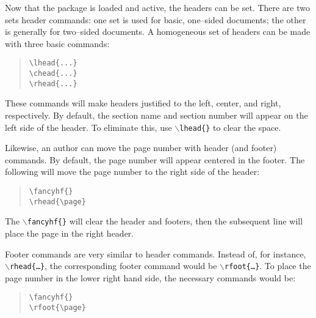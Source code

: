 \documentclass{article}
\begin{document}
Now that the package is loaded and active, the headers can be set. There are two sets header commands: one set is used for basic, one--sided documents; the other is generally for two--sided documents. A homogeneous set of headers can be made with three basic commands:
\begin{quote}
\begin{verbatim}
\lhead{...}
\chead{...}
\rhead{...}
\end{verbatim}
\end{quote}
These commands will make headers justified to the left, center, and right, respectively. By default, the section name and section number will appear on the left side of the header. To eliminate this, use \texttt{$\backslash$lhead\{\}} to clear the space.

Likewise, an author can move the page number with header (and footer) commands. By default, the page number will appear centered in the footer. The following will move the page number to the right side of the header:
\begin{quote}
\begin{verbatim}
\fancyhf{}
\rhead{\page}
\end{verbatim}
\end{quote}
The \texttt{$\backslash$fancyhf\{\}} will clear the header and footers, then the subsequent line will place the page in the right header.

Footer commands are very similar to header commands. Instead of, for instance, \texttt{$\backslash$rhead\{\ldots\}}, the corresponding footer command would be \texttt{$\backslash$rfoot\{\ldots\}}. To place the page number in the lower right hand side, the necessary commands would be:
\begin{quote}
\begin{verbatim}
\fancyhf{}
\rfoot{\page}
\end{verbatim}
\end{quote}
\end{document}
